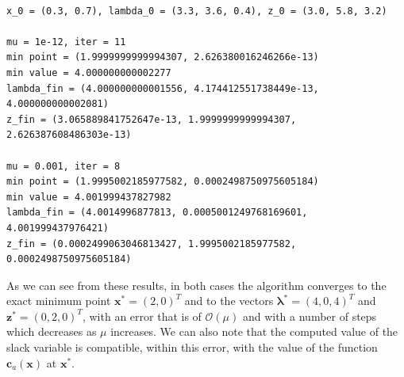 \documentclass[a4paper,11pt]{article}
\begin{document}
\begin{verbatim}

x_0 = (0.3, 0.7), lambda_0 = (3.3, 3.6, 0.4), z_0 = (3.0, 5.8, 3.2)

mu = 1e-12, iter = 11
min point = (1.9999999999994307, 2.626380016246266e-13)
min value = 4.000000000002277
lambda_fin = (4.000000000001556, 4.174412551738449e-13, 4.000000000002081)
z_fin = (3.065889841752647e-13, 1.9999999999994307, 2.626387608486303e-13)

mu = 0.001, iter = 8
min point = (1.9995002185977582, 0.0002498750975605184)
min value = 4.001999437827982
lambda_fin = (4.0014996877813, 0.0005001249768169601, 4.001999437976421)
z_fin = (0.0002499063046813427, 1.9995002185977582, 0.0002498750975605184)
\end{verbatim}

\noindent As we can see from these results, in both cases the algorithm converges to the exact minimum point $\textbf{x}^*=(2,0)^{T}$ and to the vectors $\boldsymbol{\lambda}^*=(4,0,4)^{T}$ and $\textbf{z}^*=(0,2,0)^{T}$, with an error that is of $\mathcal{O}(\mu)$ and with a number of steps which decreases as $\mu$ increases.
We can also note that the computed value of the slack variable is compatible, within this error, with the value of the function $\textbf{c}_{a}(\textbf{x})$ at $\textbf{x}^*$.\\
\end{document}
